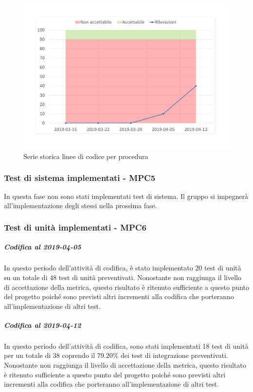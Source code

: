 \begin{figure}[H]
	\centering
	\includegraphics[scale=0.6]{images/resoconto/MPC4Chart.pdf}
	\caption{Serie storica linee di codice per procedura}	
\end{figure}

\subsubsection{Test di sistema implementati - MPC5}
In questa fase non sono stati implementati test di sistema.
Il gruppo si impegnerà all'implementazione degli stessi nella prossima fase.

\subsubsection{Test di unità implementati - MPC6}
\subparagraph{Codifica al 2019-04-05}
In questo periodo dell'attività di codifica, è stato implementato 20 test di unità su un totale di 48 test di unità preventivati.
Nonostante non raggiunga il livello di accettazione della
metrica, questo risultato è ritenuto sufficiente a questo punto del progetto poiché sono previsti altri incrementi alla codifica che porteranno all'implementazione di altri test.

\subparagraph{Codifica al 2019-04-12}
In questo periodo dell'attività di codifica, sono stati implementati 18 test di unità per un totale di 38 coprendo il 79.20\% dei test di integrazione preventivati.
Nonostante non raggiunga il livello di accettazione della
metrica, questo risultato è ritenuto sufficiente a questo punto del progetto poiché sono previsti altri incrementi alla codifica che porteranno all'implementazione di altri test.


